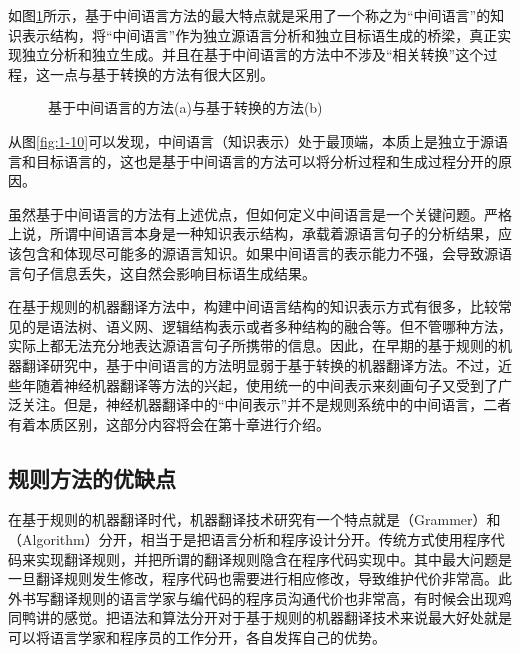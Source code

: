 \parinterval 如图\ref{fig:1-13}所示，基于中间语言方法的最大特点就是采用了一个称之为“中间语言”的知识表示结构，将“中间语言”作为独立源语言分析和独立目标语生成的桥梁，真正实现独立分析和独立生成。并且在基于中间语言的方法中不涉及“相关转换”这个过程，这一点与基于转换的方法有很大区别。

\begin{figure}[htp]
    \centering

    \caption{基于中间语言的方法(a)与基于转换的方法(b)}
    \label{fig:1-13}
\end{figure}

\parinterval 从图\ref{fig:1-10}可以发现，中间语言（知识表示）处于最顶端，本质上是独立于源语言和目标语言的，这也是基于中间语言的方法可以将分析过程和生成过程分开的原因。

\parinterval 虽然基于中间语言的方法有上述优点，但如何定义中间语言是一个关键问题。严格上说，所谓中间语言本身是一种知识表示结构，承载着源语言句子的分析结果，应该包含和体现尽可能多的源语言知识。如果中间语言的表示能力不强，会导致源语言句子信息丢失，这自然会影响目标语生成结果。

\parinterval 在基于规则的机器翻译方法中，构建中间语言结构的知识表示方式有很多，比较常见的是语法树、语义网、逻辑结构表示或者多种结构的融合等。但不管哪种方法，实际上都无法充分地表达源语言句子所携带的信息。因此，在早期的基于规则的机器翻译研究中，基于中间语言的方法明显弱于基于转换的机器翻译方法。不过，近些年随着神经机器翻译等方法的兴起，使用统一的中间表示来刻画句子又受到了广泛关注。但是，神经机器翻译中的“中间表示”并不是规则系统中的中间语言，二者有着本质区别，这部分内容将会在第十章进行介绍。


\subsection{规则方法的优缺点}

\parinterval 在基于规则的机器翻译时代，机器翻译技术研究有一个特点就是{\small{}}（Grammer）和{\small{}}（Algorithm）分开，相当于是把语言分析和程序设计分开。传统方式使用程序代码来实现翻译规则，并把所谓的翻译规则隐含在程序代码实现中。其中最大问题是一旦翻译规则发生修改，程序代码也需要进行相应修改，导致维护代价非常高。此外书写翻译规则的语言学家与编代码的程序员沟通代价也非常高，有时候会出现鸡同鸭讲的感觉。把语法和算法分开对于基于规则的机器翻译技术来说最大好处就是可以将语言学家和程序员的工作分开，各自发挥自己的优势。

